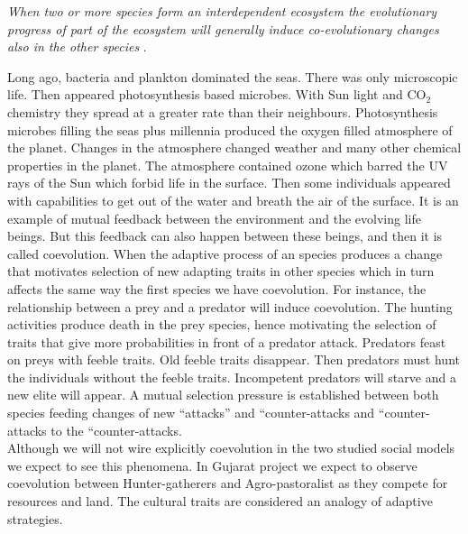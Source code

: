 \documentclass[11pt,oneside,a4paper,openright]{report}
\begin{document}
\textit{When two or more species form an interdependent ecosystem the evolutionary progress of part of the ecosystem will generally induce co-evolutionary changes also in the other species} \cite[p.154]{Gross2008}.

Long ago, bacteria and plankton dominated the seas. There was only microscopic life. Then appeared photosynthesis
based microbes. With Sun light and CO$_2$ chemistry they spread at a greater rate than their neighbours. Photosynthesis
microbes filling the seas plus millennia produced the oxygen filled atmosphere of the planet. Changes in the atmosphere
changed weather and many other chemical properties in the planet. The atmosphere contained ozone which barred the 
UV rays of the Sun which forbid life in the surface. Then some individuals appeared with capabilities to get out of 
the water and breath the air of the surface. It is an example of mutual feedback between the environment and the evolving 
life beings. But this feedback can also happen between these beings, and then it is called coevolution\cite{Dawkins1990}.
When the adaptive process of an species produces a change that motivates selection of new adapting traits in other
species which in turn affects the same way the first species we have coevolution. For instance, the relationship 
between a prey and a predator will induce coevolution. The hunting activities produce death in the prey species, hence
motivating the selection of traits that give more probabilities in front of a predator attack. Predators feast on preys 
with feeble traits. Old feeble traits disappear. Then predators must hunt the individuals without the feeble traits. Incompetent predators will starve and a new elite will appear. A mutual selection pressure is established between both species feeding changes of new ``attacks'' and ``counter-attacks and ``counter-attacks to the ``counter-attacks.\\

Although we will not wire explicitly coevolution in the two studied social models we expect to see this phenomena. In Gujarat project we expect to observe coevolution between Hunter-gatherers and Agro-pastoralist as they compete for resources and land. The cultural traits are considered an analogy of adaptive strategies. 
\end{document}
